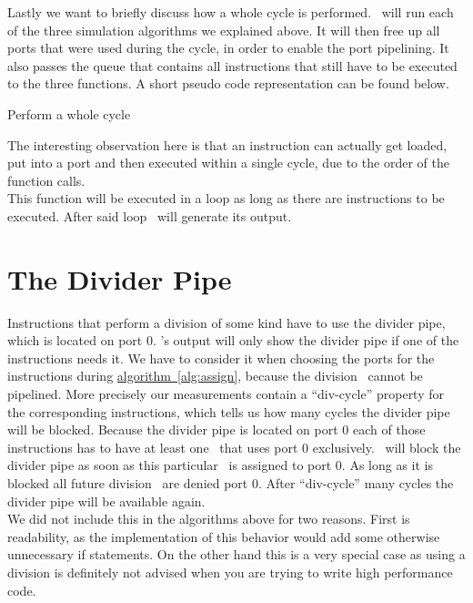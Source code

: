 Lastly we want to briefly discuss how a whole cycle is performed. \suaca\ will run each of the three simulation algorithms we explained above. It will then free up all ports that were used during the cycle, in order to enable the port pipelining. It also passes the queue that contains all instructions that still have to be executed to the three functions. A short pseudo code representation can be found below.
\newpage
\begin{algorithm}[H]
    \SetAlgoLined
    \caption{Perform a whole cycle}
\end{algorithm}
\vspace{5pt}
The interesting observation here is that an instruction can actually get loaded, put into a port and then executed within a single cycle, due to the order of the function calls.\\
This function will be executed in a loop as long as there are instructions to be executed. After said loop \suaca\ will generate its output.


\section{The Divider Pipe}
\label{sec:dividerpipe}

Instructions that perform a division of some kind have to use the divider pipe, which is located on port $0$. \suaca's output will only show the divider pipe if one of the instructions needs it. We have to consider it when choosing the ports for the instructions during \hyperref[alg:assign]{algorithm~\ref*{alg:assign}}, because the division \microops\ cannot be pipelined. More precisely our measurements contain a ``div-cycle'' property for the corresponding instructions, which tells us how many cycles the divider pipe will be blocked. Because the divider pipe is located on port $0$ each of those instructions has to have at least one \microop\ that uses port $0$ exclusively. \suaca\ will block the divider pipe as soon as this particular \microop\ is assigned to port $0$. As long as it is blocked all future division \microops\ are denied port $0$. After ``div-cycle'' many cycles the divider pipe will be available again.\\
We did not include this in the algorithms above for two reasons. First is readability, as the implementation of this behavior would add some otherwise unnecessary if statements. On the other hand this is a very special case as using a division is definitely not advised when you are trying to write high performance code.

